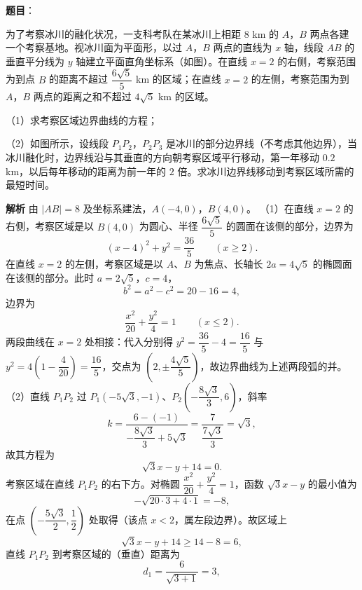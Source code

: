 \begin{answer}

\textbf{题目}：

为了考察冰川的融化状况，一支科考队在某冰川上相距 $8$ km 的 $A$，$B$ 两点各建一个考察基地。视冰川面为平面形，以过 $A$，$B$ 两点的直线为 $x$ 轴，线段 $AB$ 的垂直平分线为 $y$ 轴建立平面直角坐标系（如图）。在直线 $x=2$ 的右侧，考察范围为到点 $B$ 的距离不超过 $\dfrac{6\sqrt5}{5}$ km 的区域；在直线 $x=2$ 的左侧，考察范围为到 $A$，$B$ 两点的距离之和不超过 $4\sqrt5$ km 的区域。

（1）求考察区域边界曲线的方程；

（2）如图所示，设线段 $P_1P_2$，$P_2P_3$ 是冰川的部分边界线（不考虑其他边界），当冰川融化时，边界线沿与其垂直的方向朝考察区域平行移动，第一年移动 $0.2$ km，以后每年移动的距离为前一年的 $2$ 倍。求冰川边界线移动到考察区域所需的最短时间。
\nopagebreak[4]
\begin{center}\end{center}
\nopagebreak[4]
\textbf{解析}
由 $|AB|=8$ 及坐标系建法，$A(-4,0)$，$B(4,0)$。
（1）在直线 $x=2$ 的右侧，考察区域是以 $B(4,0)$ 为圆心、半径 $\dfrac{6\sqrt5}{5}$ 的圆面在该侧的部分，边界为
\nopagebreak[4]
\[(x-4)^2+y^2=\frac{36}{5}\qquad(x\geqslant2).\]
在直线 $x=2$ 的左侧，考察区域是以 $A$、$B$ 为焦点、长轴长 $2a=4\sqrt5$ 的椭圆面在该侧的部分。此时 $a=2\sqrt5$，$c=4$，
\nopagebreak[4]
\[b^2=a^2-c^2=20-16=4,\]
边界为
\nopagebreak[4]
\[\frac{x^2}{20}+\frac{y^2}{4}=1\qquad(x\leqslant2).\]
两段曲线在 $x=2$ 处相接：代入分别得 $y^2=\dfrac{36}{5}-4=\dfrac{16}{5}$ 与 $y^2=4\left(1-\dfrac4{20}\right)=\dfrac{16}{5}$，交点为 $\left(2,\pm\dfrac{4\sqrt5}{5}\right)$，故边界曲线为上述两段弧的并。
（2）直线 $P_1P_2$ 过 $P_1(-5\sqrt3,-1)$、$P_2\left(-\dfrac{8\sqrt3}{3},6\right)$，斜率
\nopagebreak[4]
\[k=\frac{6-(-1)}{-\dfrac{8\sqrt3}{3}+5\sqrt3}=\frac{7}{\dfrac{7\sqrt3}{3}}=\sqrt3,\]
故其方程为
\nopagebreak[4]
\[\sqrt3x-y+14=0.\]
考察区域在直线 $P_1P_2$ 的右下方。对椭圆 $\dfrac{x^2}{20}+\dfrac{y^2}{4}=1$，函数 $\sqrt3x-y$ 的最小值为
\nopagebreak[4]
\[-\sqrt{20\cdot3+4\cdot1}=-8,\]
在点 $\left(-\dfrac{5\sqrt3}{2},\dfrac12\right)$ 处取得（该点 $x<2$，属左段边界）。故区域上
\nopagebreak[4]
\[\sqrt3x-y+14\geqslant14-8=6,\]
直线 $P_1P_2$ 到考察区域的（垂直）距离为
\nopagebreak[4]
\[d_1=\frac{6}{\sqrt{3+1}}=3,\]

\end{answer}
